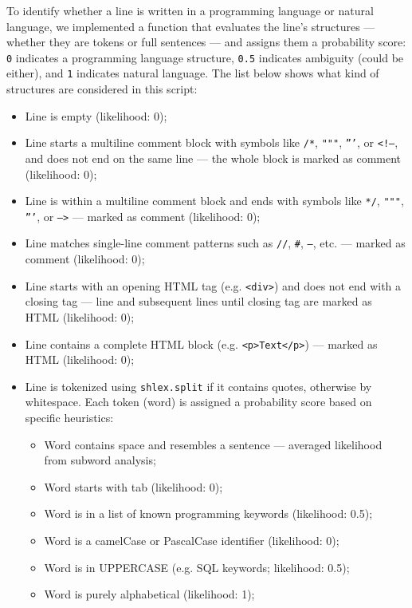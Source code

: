 To identify whether a line is written in a programming language or natural language, we implemented a function that evaluates the line’s structures --- whether they are tokens or full sentences --- and assigns them a probability score: \texttt{0} indicates a programming language structure, \texttt{0.5} indicates ambiguity (could be either), and \texttt{1} indicates natural language. The list below shows what kind of structures are considered in this script:
\begin{itemize}
    \item Line is empty (likelihood: 0);
    \item Line starts a multiline comment block with symbols like \texttt{/*}, \texttt{"""}, \texttt{'''}, or \texttt{<!--}, and does not end on the same line --- the whole block is marked as comment (likelihood: 0);
    \item Line is within a multiline comment block and ends with symbols like \texttt{*/}, \texttt{"""}, \texttt{'''}, or \texttt{-->} --- marked as comment (likelihood: 0);
    \item Line matches single-line comment patterns such as \texttt{//}, \texttt{\#}, \texttt{--}, etc. --- marked as comment (likelihood: 0);
    \item Line starts with an opening HTML tag (e.g. \texttt{<div>}) and does not end with a closing tag --- line and subsequent lines until closing tag are marked as HTML (likelihood: 0);
    \item Line contains a complete HTML block (e.g. \texttt{<p>Text</p>}) --- marked as HTML (likelihood: 0);
    \item Line is tokenized using \texttt{shlex.split} if it contains quotes, otherwise by whitespace. Each token (word) is assigned a probability score based on specific heuristics:
    \begin{itemize}
        \item Word contains space and resembles a sentence --- averaged likelihood from subword analysis;
        \item Word starts with tab (likelihood: 0);
        \item Word is in a list of known programming keywords (likelihood: 0.5);
        \item Word is a camelCase or PascalCase identifier (likelihood: 0);
        \item Word is in UPPERCASE (e.g. SQL keywords; likelihood: 0.5);
        \item Word is purely alphabetical (likelihood: 1);

\end{itemize}
\end{itemize}
